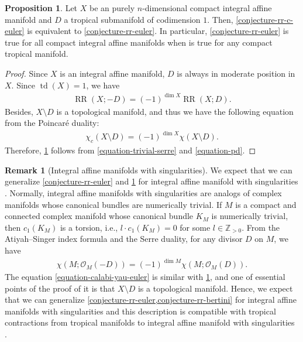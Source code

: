 \documentclass[a4paper,dvipdfmx,reqno,12pt]{amsart}
\theoremstyle{definition}
\newtheorem{proposition}[theorem]{Proposition}
\newtheorem{remark}[theorem]{Remark}
\newcommand{\opn}[1]{\operatorname{#1}}
\numberwithin{equation}{section}
\begin{document}
\begin{proposition}
\label{proposition-divisor-poincare}
Let $X$ be an purely 
$n$-dimensional compact integral
affine manifold and $D$ a tropical submanifold 
of codimension $1$.
Then, \cref{conjecture-rr-c-euler} is 
equivalent to
\cref{conjecture-rr-euler}. In particular,
\cref{conjecture-rr-euler} is true for
all compact integral affine manifolds when
\cite[Conjecture 6.13]{demedrano2023chern} is
true for any compact tropical manifold.
\end{proposition}
\begin{proof}
Since $X$ is an integral affine manifold,
$D$ is always in moderate position in $X$.
Since $\opn{td}(X)=1$, we have
\begin{align}
\label{equation-trivial-serre}
\opn{RR}(X;-D)=(-1)^{\dim X}\opn{RR}(X;D).
\end{align}
Besides, $X\setminus D$ is a topological manifold, 
and thus we have the following equation from 
the Poincar\'e duality:
\begin{align}
\label{equation-pd}
\chi_c(X\setminus D)=(-1)^{\dim X}\chi(X\setminus D).
\end{align}
Therefore, \cref{proposition-divisor-poincare} follows from
\cref{equation-trivial-serre} and
\cref{equation-pd}.
\end{proof}

\begin{remark}[{Integral affine manifolds with singularities}]
\label{remark-iass}
We expect that we can generalize
\cref{conjecture-rr-euler} and 
\cref{proposition-divisor-poincare}
for integral affine manifold with singularities
\cite{MR2213573,MR2181810,MR4347312}.
Normally, integral affine manifolds with singularities
are analogs of complex manifolds whose canonical bundles
are numerically trivial. If $M$ is a compact and
connected complex manifold whose canonical bundle $K_M$ is
numerically trivial, then $c_1(K_M)$ is a torsion,
i.e., $l\cdot c_1(K_M)=0$ for 
some $l\in \mathbb{Z}_{>0}$.
From the Atiyah--Singer index formula and the Serre duality, 
for any divisor $D$ on $M$, we have
\begin{align}
\label{equation-calabi-yau-euler}
\chi(M;\mathcal{O}_M(-D))=(-1)^{\dim M}
\chi(M;\mathcal{O}_{M}(D)).
\end{align}
The equation \cref{equation-calabi-yau-euler} is
similar with
\cref{proposition-divisor-poincare}, and 
one of essential points of the proof of it
is that $X\setminus D$ is a topological manifold.
Hence, we expect that we can generalize
\cref{conjecture-rr-euler,conjecture-rr-bertini} for 
integral affine manifolds with singularities
and this description is compatible with
tropical contractions from tropical manifolds
to integral affine manifold with singularities
\cite{yamamoto2021tropical}.
\end{remark}
\end{document}
